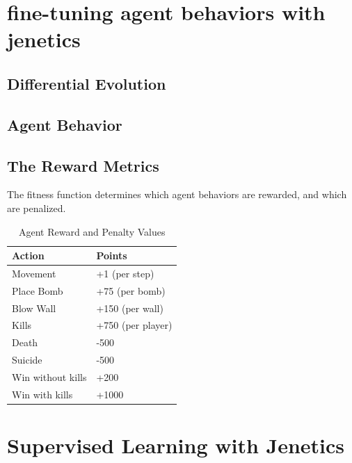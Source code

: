 \documentclass[sigconf]{acmart} %
\begin{document}
\section{fine-tuning agent behaviors with jenetics}


\subsection{Differential Evolution}

\subsection{Agent Behavior}

\subsection{The Reward Metrics}
The fitness function determines which agent behaviors are rewarded, and which are penalized.
\begin{table}[htbp]
\centering

\caption{Agent Reward and Penalty Values}

\begin{tabular}{l|l}
\textbf{Action} & \textbf{Points}  \\
\hline
Movement & +1 (per step) \\
\hline
Place Bomb & +75 (per bomb) \\
\hline
Blow Wall & +150 (per wall) \\
\hline
Kills & +750 (per player) \\
\hline
Death  & -500  \\
\hline
Suicide & -500 \\
\hline
Win without kills & +200  \\
\hline
Win with kills & +1000  \\
\hline
\end{tabular}
\end{table}


\section{Supervised Learning with Jenetics}
\end{document}
